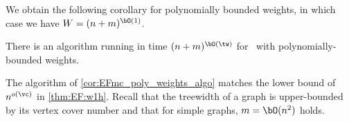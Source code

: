 \documentclass[11pt,letterpaper]{article}
\begin{document}
We obtain the following corollary for polynomially bounded weights, in which case we have $W = (n+m)^{\bO(1)}$.%

\begin{corollary}\label{cor:EFmc_poly_weights_algo}
    There is an algorithm running in time $(n+m)^{\bO(\tw)}$ for \EFmc\ with polynomially-bounded weights.
\end{corollary}

\begin{remark}\label{remark:EF:tw}
    The algorithm of \cref{cor:EFmc_poly_weights_algo} matches the lower bound of $n^{o(\vc)}$ in \cref{thm:EF:w1h}.
    Recall that the treewidth of a graph is upper-bounded by its vertex cover number and that for simple graphs, $m = \bO(n^2)$ holds.
\end{remark}
\end{document}
